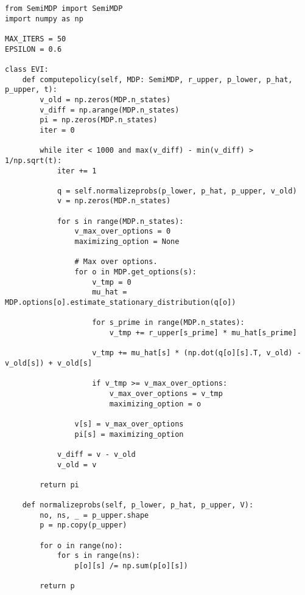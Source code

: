 \begin{verbatim}
from SemiMDP import SemiMDP
import numpy as np

MAX_ITERS = 50
EPSILON = 0.6

class EVI:
    def computepolicy(self, MDP: SemiMDP, r_upper, p_lower, p_hat, p_upper, t):
        v_old = np.zeros(MDP.n_states)
        v_diff = np.arange(MDP.n_states)
        pi = np.zeros(MDP.n_states)
        iter = 0

        while iter < 1000 and max(v_diff) - min(v_diff) > 1/np.sqrt(t):
            iter += 1

            q = self.normalizeprobs(p_lower, p_hat, p_upper, v_old)
            v = np.zeros(MDP.n_states)

            for s in range(MDP.n_states):
                v_max_over_options = 0
                maximizing_option = None

                # Max over options.
                for o in MDP.get_options(s):
                    v_tmp = 0
                    mu_hat = MDP.options[o].estimate_stationary_distribution(q[o])

                    for s_prime in range(MDP.n_states):
                        v_tmp += r_upper[s_prime] * mu_hat[s_prime]

                    v_tmp += mu_hat[s] * (np.dot(q[o][s].T, v_old) - v_old[s]) + v_old[s]

                    if v_tmp >= v_max_over_options:
                        v_max_over_options = v_tmp
                        maximizing_option = o

                v[s] = v_max_over_options
                pi[s] = maximizing_option

            v_diff = v - v_old
            v_old = v

        return pi

    def normalizeprobs(self, p_lower, p_hat, p_upper, V):
        no, ns, _ = p_upper.shape
        p = np.copy(p_upper)

        for o in range(no):
            for s in range(ns):
                p[o][s] /= np.sum(p[o][s])

        return p
\end{verbatim}

\newpage
